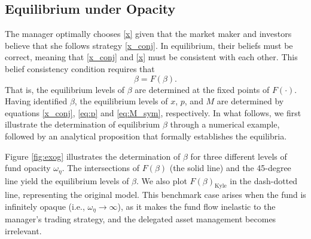 \subsection{Equilibrium under Opacity} \label{ss:equilibrium}
The manager optimally chooses \eqref{x} given that the market maker and investors believe that she follows strategy \eqref{x_conj}. In equilibrium, their beliefs must be correct, meaning that \eqref{x_conj} and \eqref{x} must be consistent with each other. This belief consistency condition requires that
\begin{equation}
\beta=F(\beta).\label{fixed_point}
\end{equation}
That is, the equilibrium levels of $\beta$ are determined at the fixed points of $F(\cdot)$. Having identified $\beta$, the equilibrium levels of $x$, $p$, and $M$ are determined by equations \eqref{x_conj}, \eqref{eq:p} and \eqref{eq:M_sym}, respectively. In what follows, we first illustrate the determination of equilibrium $\beta$ through a numerical example, followed by an analytical proposition that formally establishes the equilibria.



Figure \ref{fig:exog} illustrates the determination of $\beta$ for three different levels of fund opacity $\omega_{\eta}$.
The intersections of $F(\beta)$ (the solid line) and the 45-degree line yield the equilibrium levels of $\beta$. We also plot $F(\beta)_{\text{Kyle}}$ in the dash-dotted line, representing the original \citet{kyle1985continuous} model. This benchmark case arises when the fund is infinitely opaque (i.e., $\omega_{\eta}\rightarrow \infty$), as it makes the fund flow inelastic to the manager's trading strategy, and the delegated asset management becomes irrelevant.

